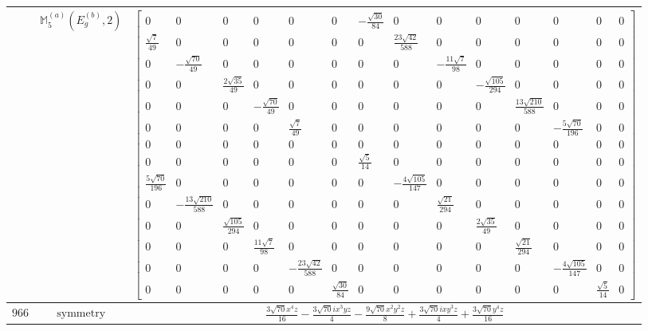 \documentclass[fleqn,8pt,landscape]{jsarticle}
\begin{document}
\begin{longtable}{ccc}
$  $ & $ \mathbb{M}_{5}^{(a)}(E_{g}^{(b)},2) $ & $ \begin{bmatrix} 0 & 0 & 0 & 0 & 0 & 0 & - \frac{\sqrt{30}}{84} & 0 & 0 & 0 & 0 & 0 & 0 & 0 \\ \frac{\sqrt{7}}{49} & 0 & 0 & 0 & 0 & 0 & 0 & \frac{23 \sqrt{42}}{588} & 0 & 0 & 0 & 0 & 0 & 0 \\ 0 & - \frac{\sqrt{70}}{49} & 0 & 0 & 0 & 0 & 0 & 0 & - \frac{11 \sqrt{7}}{98} & 0 & 0 & 0 & 0 & 0 \\ 0 & 0 & \frac{2 \sqrt{35}}{49} & 0 & 0 & 0 & 0 & 0 & 0 & - \frac{\sqrt{105}}{294} & 0 & 0 & 0 & 0 \\ 0 & 0 & 0 & - \frac{\sqrt{70}}{49} & 0 & 0 & 0 & 0 & 0 & 0 & \frac{13 \sqrt{210}}{588} & 0 & 0 & 0 \\ 0 & 0 & 0 & 0 & \frac{\sqrt{7}}{49} & 0 & 0 & 0 & 0 & 0 & 0 & - \frac{5 \sqrt{70}}{196} & 0 & 0 \\ 0 & 0 & 0 & 0 & 0 & 0 & 0 & 0 & 0 & 0 & 0 & 0 & 0 & 0 \\ 0 & 0 & 0 & 0 & 0 & 0 & \frac{\sqrt{5}}{14} & 0 & 0 & 0 & 0 & 0 & 0 & 0 \\ \frac{5 \sqrt{70}}{196} & 0 & 0 & 0 & 0 & 0 & 0 & - \frac{4 \sqrt{105}}{147} & 0 & 0 & 0 & 0 & 0 & 0 \\ 0 & - \frac{13 \sqrt{210}}{588} & 0 & 0 & 0 & 0 & 0 & 0 & \frac{\sqrt{21}}{294} & 0 & 0 & 0 & 0 & 0 \\ 0 & 0 & \frac{\sqrt{105}}{294} & 0 & 0 & 0 & 0 & 0 & 0 & \frac{2 \sqrt{35}}{49} & 0 & 0 & 0 & 0 \\ 0 & 0 & 0 & \frac{11 \sqrt{7}}{98} & 0 & 0 & 0 & 0 & 0 & 0 & \frac{\sqrt{21}}{294} & 0 & 0 & 0 \\ 0 & 0 & 0 & 0 & - \frac{23 \sqrt{42}}{588} & 0 & 0 & 0 & 0 & 0 & 0 & - \frac{4 \sqrt{105}}{147} & 0 & 0 \\ 0 & 0 & 0 & 0 & 0 & \frac{\sqrt{30}}{84} & 0 & 0 & 0 & 0 & 0 & 0 & \frac{\sqrt{5}}{14} & 0 \end{bmatrix} $ \\ \hline
$ 966 $ & $ \text{symmetry} $ & $ \frac{3 \sqrt{70} x^{4} z}{16} - \frac{3 \sqrt{70} i x^{3} y z}{4} - \frac{9 \sqrt{70} x^{2} y^{2} z}{8} + \frac{3 \sqrt{70} i x y^{3} z}{4} + \frac{3 \sqrt{70} y^{4} z}{16} $ \\

\end{longtable}
\end{document}
